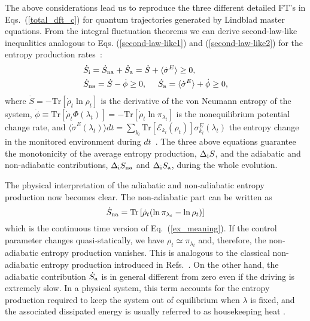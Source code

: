 \documentclass[aps,prx,twocolumn,showpacs,floatfix,superscriptaddress,graphics,longbibliography]{revtex4-1}
\newcommand{\tr}{\mathrm{Tr}}
\newcommand{\E}{{\mathcal E}}
\newcommand{\HAT}{}
\begin{document}
The above considerations lead us to reproduce the three different detailed FT's in Eqs.~(\ref{total_dft_c}) for quantum trajectories 
generated by Lindblad master equations.
From the integral fluctuation theorems we can derive second-law-like inequalities analogous to Eqs. (\ref{second-law-like1}) and (\ref{second-law-like2})
for the entropy production rates~\cite{JordanParrondo}:
\begin{align} \label{dynamical-sl1}
& \dot{S}_{\rm i}  = \dot{S}_{\rm na} + \dot{S}_{\rm a} = \dot{S} + \langle \dot{\sigma}^E \rangle \geq 0, \\ \label{dynamical-sl2}
& \dot{S}_{\rm na}  = \dot{S} - \dot{\phi} \geq 0, ~~~~
\dot{S}_{\rm a} = \langle \dot{\sigma}^E \rangle + \dot{\phi} \geq 0, 
\end{align}
where $\dot{S} = - \tr[\dot{\rho}_t \ln \rho_t]$ is the derivative of the von Neumann entropy of the system, $\dot{\phi} \equiv \tr[\dot{\rho}_t \HAT{\Phi}(\lambda_t)]=-\tr [\dot\rho_t \ln\pi_{\lambda_t}]$ is the nonequilibrium 
potential change rate, and $\langle \dot{\sigma}^E(\lambda_t) \rangle dt = \sum_{k_l} \tr[\E_{k_l}(\rho_t)]\sigma_{k_l}^E(\lambda_t)$ the entropy change in the monitored environment during $dt$~\cite{JordanSagawa}.
The three above equations guarantee the monotonicity of the average entropy production, 
$\Delta_{\rm i} S$, and the adiabatic and non-adiabatic contributions, $\Delta_{\rm i} S_{\rm na}$ and $\Delta_{\rm i} S_{\rm a}$, during the whole evolution.

The physical interpretation of the adiabatic and non-adiabatic entropy production now becomes clear. 
The non-adiabatic part can be written as
\begin{equation}\label{non-adiab_lind}
\dot{S}_{\rm na}= \tr \left[ \dot\rho_t (\ln \pi_{\lambda_t}-\ln\rho_t) \right]
\end{equation}
which is the continuous time version of Eq.~(\ref{ex_meaning}).
If the control parameter changes quasi-statically, we have $\rho_t \simeq \pi_{\lambda_t}$ and, therefore, the non-adiabatic entropy production vanishes. This is analogous to the classical non-adiabatic entropy production introduced in Refs.~\cite{HatanoSasa,EspositoFaces, EspositoFacesI,EspositoFacesII}. 
On the other hand, the adiabatic contribution $\dot{S}_{\rm a}$ is in general different from zero even if the driving is extremely slow. In a physical system, this term accounts for the entropy production required to keep the system out of equilibrium when $\lambda$ is fixed, and the associated dissipated energy is usually referred to as housekeeping heat \cite{HatanoSasa}. 
\end{document}
